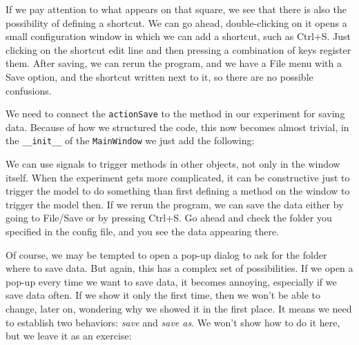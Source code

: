 If we pay attention to what appears on that square, we see that there is also the possibility of defining a shortcut. We can go ahead, double-clicking on it opens a small configuration window in which we can add a shortcut, such as Ctrl+S. Just clicking on the shortcut edit line and then pressing a combination of keys register them. After saving, we can rerun the program, and we have a File menu with a Save option, and the shortcut written next to it, so there are no possible confusions.

We need to connect the \texttt{actionSave} to the method in our experiment for saving data. Because of how we structured the code, this now becomes almost trivial, in the \texttt{\_\_init\_\_} of the \texttt{MainWindow} we just add the following:


We can use signals to trigger methods in other objects, not only in the window itself. When the experiment gets more complicated, it can be constructive just to trigger the model to do something than first defining a method on the window to trigger the model then. If we rerun the program, we can save the data either by going to File/Save or by pressing Ctrl+S. Go ahead and check the folder you specified in the config file, and you see the data appearing there.


Of course, we may be tempted to open a pop-up dialog to ask for the folder where to save data. But again, this has a complex set of possibilities. If we open a pop-up every time we want to save data, it becomes annoying, especially if we save data often. If we show it only the first time, then we won't be able to change, later on, wondering why we showed it in the first place. It means we need to establish two behaviors: \emph{save} and \emph{save as}. We won't show how to do it here, but we leave it as an exercise:

